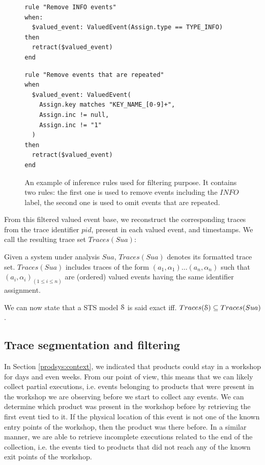 \begin{figure}[ht]
\begin{framed}
\begin{BVerbatim}
rule "Remove INFO events"
when:
  $valued_event: ValuedEvent(Assign.type == TYPE_INFO)
then
  retract($valued_event)
end
\end{BVerbatim}
\end{framed}

\begin{framed}
\begin{BVerbatim}
rule "Remove events that are repeated"
when
  $valued_event: ValuedEvent(
    Assign.key matches "KEY_NAME_[0-9]+",
    Assign.inc != null,
    Assign.inc != "1"
  )
then
  retract($valued_event)
end
\end{BVerbatim}
\end{framed}

\caption{An example of inference rules used for filtering
purpose. It contains two rules: the first one is used to remove
events including the $INFO$ label, the second one is used to omit
events that are repeated.}
\label{fig:removalrules}
\end{figure}

From this filtered valued event base, we reconstruct the
corresponding traces from the trace identifier $pid$, present in
each valued event, and timestamps. We call the resulting trace
set $Traces(Sua)$:

\begin{definition}
    Given a system under analysis $\mathit{Sua}$, $Traces(Sua)$ denotes
    its formatted trace set. $Traces(Sua)$ includes traces of the
    form $(a_1,\alpha_1) \dots (a_n,\alpha_n)$ such that
    $(a_i,\alpha_i)_{(1 \leq i \leq n)}$ are (ordered) valued
    events having the same identifier assignment.

	\label{def:structuredtrace}
\end{definition}

We can now state that a STS model $\EuScript{S}$ is said exact
iff. $Traces(\EuScript{S}) \subseteq Traces(Sua)$.


\subsection{Trace segmentation and filtering}
\label{sec:modelinf:prodsystems:segmentation}

In Section \ref{prodsys:context}, we indicated that products
could stay in a workshop for days and even weeks. From our point
of view, this means that we can likely collect partial
executions, i.e. events belonging to products that were present
in the workshop we are observing before we start to collect any
events. We can determine which product was present in the
workshop before by retrieving the first event tied to it.
If the physical location of this event is not one of the known
entry points of the workshop, then the product was there before.
In a similar manner, we are able to retrieve incomplete
executions related to the end of the collection, i.e. the events
tied to products that did not reach any of the known exit points
of the workshop.

